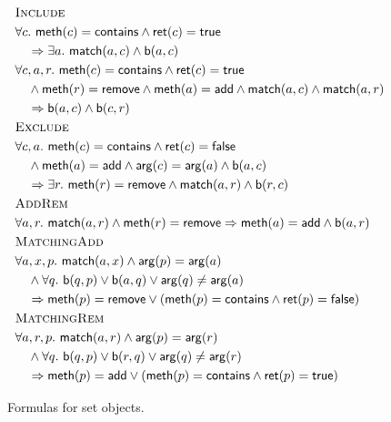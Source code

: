 \begin{figure}

  \footnotesize
  \begin{align*}
    & \textsc{Include} \\
    & \forall c.\ {\sf meth}(c) = {\sf contains} \land {\sf ret}(c) = {\sf true} \\
    & \quad \implies \exists a.\ {\sf match}(a,c) \land {\sf b}(a,c) \\
    & \forall c,a,r.\ {\sf meth}(c)={\sf contains} \land {\sf ret}(c) = {\sf true} \\
    & \quad \land {\sf meth}(r) = {\sf remove}\land {\sf meth}(a) = {\sf add} \land  {\sf match}(a,c) \land {\sf match}(a,r)  \\
    & \quad \implies {\sf b}(a,c) \land {\sf b}(c,r)
    \\
    & \textsc{Exclude} \\
    & \forall c,a.\ {\sf meth}(c)={\sf contains} \land {\sf ret}(c) = {\sf false} \\
    & \quad \land {\sf meth}(a) = {\sf add}\land {\sf arg}(c) = {\sf arg}(a) \land {\sf b}(a,c) \\
    & \quad \implies \exists r.\ {\sf meth}(r)={\sf remove} \land {\sf match}(a,r) \land {\sf b}(r,c)
    \\
    & \textsc{AddRem} \\
    & \forall a,r.\ {\sf match}(a,r) \land {\sf meth}(r) = {\sf remove}  \implies {\sf meth}(a)={\sf add} \land {\sf b}(a,r) 
    \\
    & \textsc{MatchingAdd} \\
    & \forall a,x,p.\ {\sf match}(a,x) \land {\sf arg}(p) = {\sf arg}(a) \\
    & \quad \land \forall q.\ {\sf b}(q,p) \vee {\sf b}(a,q) \vee {\sf arg}(q)\neq {\sf arg}(a) \\
    & \quad \implies {\sf meth}(p)={\sf remove} \vee ({\sf meth}(p)={\sf contains} \land {\sf ret}(p) = {\sf false}) 
    \\
    & \textsc{MatchingRem} \\
    & \forall a,r,p.\ {\sf match}(a,r) \land {\sf arg}(p) = {\sf arg}(r) \\ %
    & \quad \land \forall q.\ {\sf b}(q,p) \vee {\sf b}(r,q) \vee {\sf arg}(q)\neq {\sf arg}(r) \\
    & \quad \implies {\sf meth}(p)={\sf add} \vee ({\sf meth}(p)={\sf contains} \land {\sf ret}(p) = {\sf true}) 
  \end{align*}

  \caption{Formulas for set objects.}
  \label{fig:formulas:set}

\end{figure}


